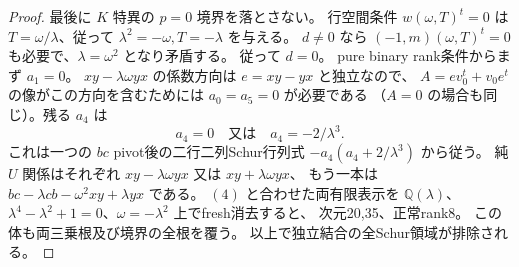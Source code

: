 \begin{proof}
最後に $K$ 特異の $p=0$ 境界を落とさない。
行空間条件 $w(\omega,T)^t=0$ は $T=\omega/\lambda$、従って
$\lambda^2=-\omega,T=-\lambda$ を与える。
$d\ne0$ なら $(-1,m)(\omega,T)^t=0$ も必要で、$\lambda=\omega^2$ となり矛盾する。
従って $d=0$。
pure binary rank条件からまず $a_1=0$。
$xy-\lambda\omega yx$ の係数方向は $e=xy-yx$ と独立なので、
$A=ev_0^t+v_0e^t$ の像がこの方向を含むためには $a_0=a_5=0$ が必要である
（$A=0$ の場合も同じ）。残る $a_4$ は
\[
 a_4=0\quad\text{又は}\quad a_4=-2/\lambda^3.
\]
これは一つの $bc$ pivot後の二行二列Schur行列式
$-a_4(a_4+2/\lambda^3)$ から従う。
純 $U$ 関係はそれぞれ $xy-\lambda\omega yx$ 又は $xy+\lambda\omega yx$、
もう一本は
$bc-\lambda cb-\omega^2xy+\lambda yx$ である。
$(4)$ と合わせた両有限表示を
$\mathbb Q(\lambda)$、$\lambda^4-\lambda^2+1=0$、$\omega=-\lambda^2$ 上でfresh消去すると、
次元20,35、正常rank8。
この体も両三乗根及び境界の全根を覆う。
以上で独立結合の全Schur領域が排除される。
\end{proof}
